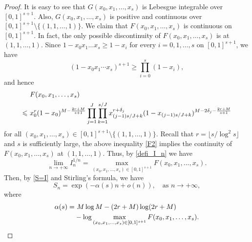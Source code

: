 \documentclass[12pt]{article}
\numberwithin{equation}{section}
\begin{document}
\begin{proof}
It is easy to see that $G(x_0,x_1,\ldots,x_s)$ is Lebesgue integrable over $[0,1]^{s+1}$. Also, $G(x_0,x_1,\ldots,x_s)$ is positive and continuous over $[0,1]^{s+1} \setminus \{(1,1,\ldots,1)\}$. We claim that $F(x_0,x_1,\ldots,x_s)$ is continuous on $[0,1]^{s+1}$. In fact, the only possible discontinuity of $F(x_0,x_1,\ldots,x_s)$ is at $(1,1,\ldots,1)$. Since $1-x_0x_1\ldots x_s \geqslant 1-x_i$ for every $i=0,1,\ldots,s$ on $[0,1]^{s+1}$, we have
\[ (1-x_0x_1\cdots x_s)^{s+1} \geqslant \prod_{i=0}^{s} (1-x_i), \]
and hence 
\begin{align}
&~F(x_0,x_1,\ldots,x_s) \notag\\
\leqslant&~ x_0^{r}(1-x_0)^{M-\frac{2r+M}{s+1}}\prod_{j=1}^{J}\prod_{k=1}^{s/J} x_{(j-1)s/J +k}^{r+\delta_j} (1-x_{(j-1)s/J +k})^{M-2\delta_j- \frac{2r+M}{s+1}} \label{F2}
\end{align}
for all $(x_0,x_1,\ldots,x_s) \in [0,1]^{s+1} \setminus \{ (1,1,\ldots,1) \}$. Recall that $r = \lfloor s/\log^2 s \rfloor$ and $s$ is sufficiently large, the above inequality \eqref{F2} implies the continuity of $F(x_0,x_1,\ldots,x_s)$ at $(1,1,\ldots,1)$. Thus, by \eqref{defi_I_n} we have
\[ \lim_{n \to +\infty} I_n^{1/n} = \max_{(x_0,x_1,\ldots,x_s) \in [0,1]^{s+1}} F(x_0,x_1,\ldots,x_s). \]
Then, by \eqref{S=I} and Stirling's formula, we have
\[ S_n = \exp\left( -\alpha(s)n + o(n) \right), \quad\text{as~} n \to +\infty, \]
where
\begin{align}
\alpha(s) =&~  M\log M - (2r+M)\log(2r+M) \notag\\
&- \log \max_{(x_0,x_1,\ldots,x_s) \in [0,1]^{s+1}} F(x_0,x_1,\ldots,x_s). \label{defi_alpha}
\end{align}


\end{proof}
\end{document}
